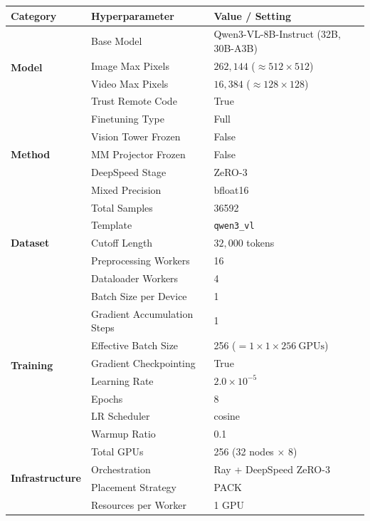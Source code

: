 \begin{table}[!tbp]
\centering
\small
\setlength{\tabcolsep}{6pt}
\renewcommand{\arraystretch}{1.1}
\setlength{\abovecaptionskip}{14pt}
\begin{tabular}{@{}l l p{}@{}}
\toprule
\textbf{Category} & \textbf{Hyperparameter} & \textbf{Value / Setting} \\
\midrule
\multirow{4}{*}{\textbf{Model}}
& Base Model & Qwen3-VL-8B-Instruct (32B, 30B-A3B) \\
& Image Max Pixels & $262{,}144$ ($\approx 512 \times 512$) \\
& Video Max Pixels & $16{,}384$ ($\approx 128 \times 128$) \\
& Trust Remote Code & True \\
\midrule
\multirow{5}{*}{\textbf{Method}}
& Finetuning Type & Full \\
& Vision Tower Frozen & False \\
& MM Projector Frozen & False \\
& DeepSpeed Stage & ZeRO-3 \\
& Mixed Precision & bfloat16 \\
\midrule
\multirow{5}{*}{\textbf{Dataset}}
& Total Samples & 36592 \\
& Template & \texttt{qwen3\_vl} \\
& Cutoff Length & $32{,}000$ tokens \\
& Preprocessing Workers & 16 \\
& Dataloader Workers & 4 \\
\midrule
\multirow{8}{*}{\textbf{Training}}
& Batch Size per Device & 1 \\
& Gradient Accumulation Steps & 1 \\
& Effective Batch Size & 256 ($= 1 \times 1 \times 256~\text{GPUs}$) \\
& Gradient Checkpointing & True \\
& Learning Rate & $2.0 \times 10^{-5}$ \\
& Epochs & 8 \\
& LR Scheduler & cosine \\
& Warmup Ratio & 0.1 \\
\midrule
\multirow{4}{*}{\textbf{Infrastructure}}
& Total GPUs & 256 (32 nodes $\times$ 8) \\
& Orchestration & Ray + DeepSpeed ZeRO-3 \\
& Placement Strategy & PACK \\
& Resources per Worker & 1 GPU \\

\end{tabular}
\end{table}
